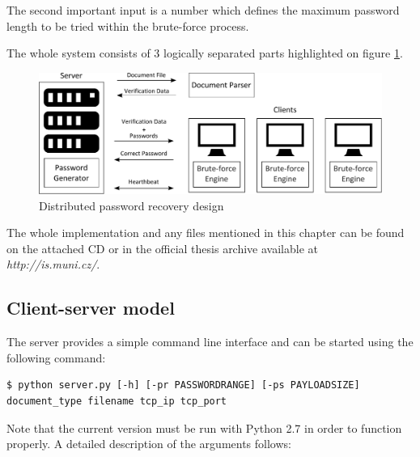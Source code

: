 \documentclass[11pt,oneside]{fithesis2}
\begin{document}
The second important input is a number which defines the maximum password length to be tried within the brute-force process.

The whole system consists of 3 logically separated parts highlighted on figure \ref{ddpbf_design}. 

\begin{figure}[ht]
	\centering
	\includegraphics[width=1\textwidth]{figures/ddpbf_design.pdf}
	\caption{Distributed password recovery design}
	\label{ddpbf_design}
\end{figure}

The whole implementation and any files mentioned in this chapter can be found on the attached CD or in the official thesis archive available at \textit{http://is.muni.cz/}.

\subsection{Client-server model}\label{client-server}

The server provides a simple command line interface and can be started using the following command: 

\begin{lstlisting}
$ python server.py [-h] [-pr PASSWORDRANGE] [-ps PAYLOADSIZE] document_type filename tcp_ip tcp_port
\end{lstlisting}

Note that the current version must be run with Python 2.7 in order to function properly. A detailed description of the arguments follows:
\end{document}
